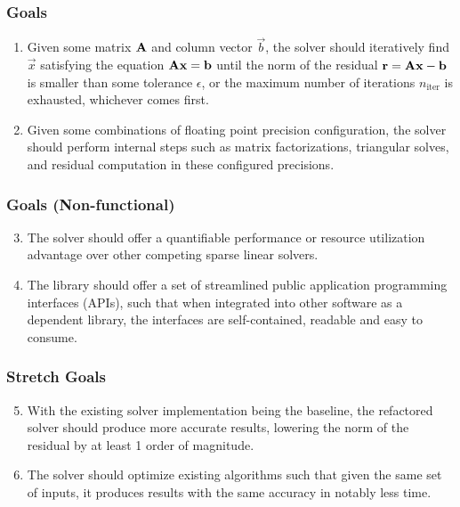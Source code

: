 \documentclass[t,12pt,numbers,fleqn]{beamer}
\begin{document}

\begin{frame}
\frametitle{Goals}

\begin{enumerate}[{GS}1]
\item Given some matrix \(\mathbf{A}\) and column vector \(\vec{b}\), the solver
  should iteratively find \(\vec{x}\) satisfying the equation \(\mathbf{A}\mathbf{x}
  = \mathbf{b}\) until the norm of the residual \(\mathbf{r} = \mathbf{A}\mathbf{x} -
  \mathbf{b}\) is smaller than some tolerance \(\epsilon\), or the maximum number
  of iterations \(n_\mathrm{iter}\) is exhausted, whichever comes first.
\item Given some combinations of floating point precision configuration, the solver
  should perform internal steps such as matrix factorizations, triangular
  solves, and residual computation in these configured precisions.
\end{enumerate}

\end{frame}


\begin{frame}
\frametitle{Goals (Non-functional)}

\begin{enumerate}[{GS}1]
  \setcounter{enumi}{2}
\item The solver should offer a quantifiable performance or resource utilization
  advantage over other competing sparse linear solvers.
\item The library should offer a set of streamlined public application
  programming interfaces (APIs), such that when integrated into other software
  as a dependent library, the interfaces are self-contained, readable and easy
  to consume.
\end{enumerate}

\end{frame}


\begin{frame}
\frametitle{Stretch Goals}

\begin{enumerate}[{GS}1]
  \setcounter{enumi}{4}
\item With the existing solver implementation being the baseline, the refactored
  solver should produce more accurate results, lowering the norm of the residual
  by at least 1 order of magnitude.
\item The solver should optimize existing algorithms such that given the same set
  of inputs, it produces results with the same accuracy in notably less time.
\end{enumerate}

\end{frame}
\end{document}
